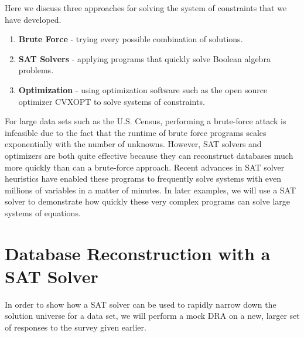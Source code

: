 \documentclass[5p,times,11pt]{elsarticle}
\begin{document}
Here we discuss three approaches for solving the system of constraints that we have developed.
\begin{enumerate}

\item \textbf{Brute Force} - trying every possible combination of solutions.\\

\item \textbf{SAT Solvers} - applying programs that quickly solve Boolean algebra problems.\\

\item \textbf{Optimization} -  using optimization software such as the open source optimizer CVXOPT to solve systems of constraints.

\end{enumerate}

For large data sets such as the U.S. Census, performing a brute-force attack is infeasible due to the fact that the runtime of brute force programs scales exponentially with the number of unknowns. However, SAT solvers and optimizers are both quite effective because they can reconstruct databases much more quickly than can a brute-force approach. Recent advances in SAT solver heuristics have enabled these programs to frequently solve systems with even millions of variables in a matter of minutes. In later examples, we will use a SAT solver to demonstrate how quickly these very complex programs can solve large systems of equations.

\section{Database Reconstruction with a SAT Solver}

In order to show how a SAT solver can be used to rapidly narrow down the solution universe for a data set, we will perform a mock DRA on a new, larger set of responses to the survey given earlier.
\end{document}
